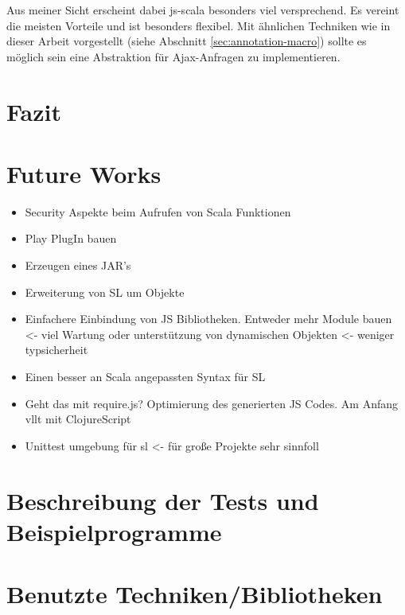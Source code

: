 \documentclass[12pt,bibtotoc]{scrreprt}
\begin{document}
Aus meiner Sicht erscheint dabei js-scala besonders viel versprechend. Es vereint die meisten Vorteile und ist besonders flexibel. Mit ähnlichen Techniken wie in dieser Arbeit vorgestellt (siehe Abschnitt \ref{sec:annotation-macro}) sollte es möglich sein eine Abstraktion für Ajax-Anfragen zu implementieren.

\chapter{Fazit}
\label{chap:conclusion}

\appendix

\chapter{Future Works}
\label{sec:future-works}

\begin{itemize}
 \item{Security Aspekte beim Aufrufen von Scala Funktionen}
 \item{Play PlugIn bauen}
 \item{Erzeugen eines JAR's}
 \item{Erweiterung von SL um Objekte}
 \item{Einfachere Einbindung von JS Bibliotheken. Entweder mehr Module bauen <- viel Wartung oder unterstützung von dynamischen Objekten <- weniger typsicherheit}
 \item{Einen besser an Scala angepassten Syntax für SL}
 \item{Geht das mit require.js? Optimierung des generierten JS Codes. Am Anfang vllt mit ClojureScript}
 \item{Unittest umgebung für sl <- für große Projekte sehr sinnfoll}
\end{itemize}

\chapter{Beschreibung der Tests und Beispielprogramme}
\label{chap:tests-and-examples}


\chapter{Benutzte Techniken/Bibliotheken}
\end{document}

